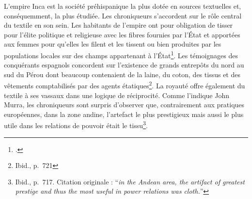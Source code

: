 L'empire Inca est la société préhispanique la plus dotée en sources textuelles et, conséquemment, la plus étudiée. Les chroniqueurs s'accordent sur le rôle central du textile en son sein. Les habitants de l'empire ont pour obligation de tisser pour l'élite politique et religieuse avec les fibres fournies par l'État et apportées aux femmes pour qu'elles les filent et les tissent ou bien produites par les populations locales sur des champs appartenant à l'État\footcite[p.~715-716]{murraClothItsFunctions1962}. Les témoignages des conquérants espagnols concordent sur l'existence de grands entrepôts du nord au sud du Pérou dont beaucoup contenaient de la laine, du coton, des tissus et des vêtements comptabilisés par des agents étatiques\footnote{Ibid., p.~721}. La royauté offre également du textile à ses vassaux dans une logique de réciprocité. Comme l'indique John Murra, les chroniqueurs sont surpris d'observer que, contrairement aux pratiques européennes, \og dans la zone andine, l'artefact le plus prestigieux mais aussi le plus utile dans les relations de pouvoir était le tissu\fg\footnote{Ibid., p.~717. Citation originale : \textquotedblleft \textit{in the Andean area, the artifact of greatest prestige and thus the most useful in power relations was cloth.}\textquotedblright}. 

